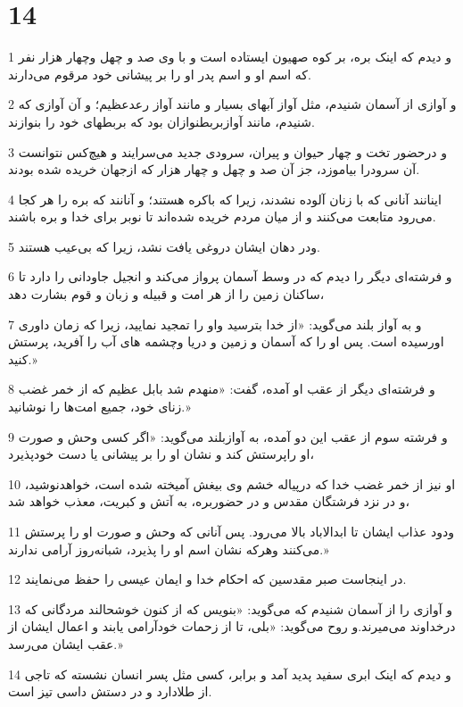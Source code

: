 \chapter{14}

\par 1 و دیدم که اینک بره، بر کوه صهیون ایستاده است و با وی صد و چهل وچهار هزار نفر که اسم او و اسم پدر او را بر پیشانی خود مرقوم می‌دارند.
\par 2 و آوازی از آسمان شنیدم، مثل آواز آبهای بسیار و مانند آواز رعدعظیم؛ و آن آوازی که شنیدم، مانند آوازبربطنوازان بود که بربطهای خود را بنوازند.
\par 3 و درحضور تخت و چهار حیوان و پیران، سرودی جدید می‌سرایند و هیچ‌کس نتوانست آن سرودرا بیاموزد، جز آن صد و چهل و چهار هزار که ازجهان خریده شده بودند.
\par 4 اینانند آنانی که با زنان آلوده نشدند، زیرا که باکره هستند؛ و آنانند که بره را هر کجا می‌رود متابعت می‌کنند و از میان مردم خریده شده‌اند تا نوبر برای خدا و بره باشند.
\par 5 ودر دهان ایشان دروغی یافت نشد، زیرا که بی‌عیب هستند.
\par 6 و فرشته‌ای دیگر را دیدم که در وسط آسمان پرواز می‌کند و انجیل جاودانی را دارد تا ساکنان زمین را از هر امت و قبیله و زبان و قوم بشارت دهد،
\par 7 و به آواز بلند می‌گوید: «از خدا بترسید واو را تمجید نمایید، زیرا که زمان داوری اورسیده است. پس او را که آسمان و زمین و دریا وچشمه های آب را آفرید، پرستش کنید.»
\par 8 و فرشته‌ای دیگر از عقب او آمده، گفت: «منهدم شد بابل عظیم که از خمر غضب زنای خود، جمیع امت‌ها را نوشانید.»
\par 9 و فرشته سوم از عقب این دو آمده، به آوازبلند می‌گوید: «اگر کسی وحش و صورت او راپرستش کند و نشان او را بر پیشانی یا دست خودپذیرد،
\par 10 او نیز از خمر غضب خدا که در‌پیاله خشم وی بیغش آمیخته شده است، خواهدنوشید، و در نزد فرشتگان مقدس و در حضوربره، به آتش و کبریت، معذب خواهد شد،
\par 11 ودود عذاب ایشان تا ابدالاباد بالا می‌رود. پس آنانی که وحش و صورت او را پرستش می‌کنند وهر‌که نشان اسم او را پذیرد، شبانه‌روز آرامی ندارند.»
\par 12 در اینجاست صبر مقدسین که احکام خدا و ایمان عیسی را حفظ می‌نمایند.
\par 13 و آوازی را از آسمان شنیدم که می‌گوید: «بنویس که از کنون خوشحالند مردگانی که درخداوند می‌میرند.و روح می‌گوید: «بلی، تا از زحمات خودآرامی یابند و اعمال ایشان از عقب ایشان می‌رسد.»
\par 14 و دیدم که اینک ابری سفید پدید آمد و برابر، کسی مثل پسر انسان نشسته که تاجی از طلادارد و در دستش داسی تیز است.
